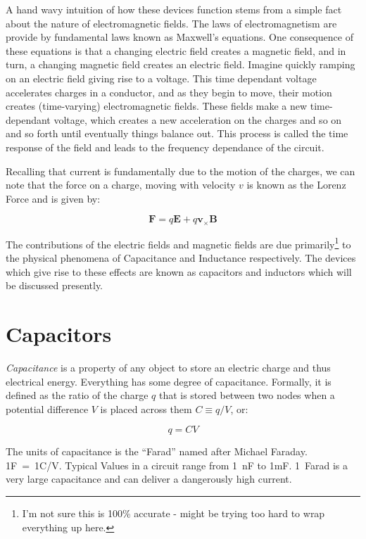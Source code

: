 \documentclass{tufte-book}
\begin{document}
A hand wavy intuition of how these devices function stems from a simple fact about the nature of electromagnetic fields. The laws of electromagnetism are provide by fundamental laws known as Maxwell's equations. One consequence of these equations is that a changing electric field creates a magnetic field, and in turn, a changing magnetic field creates an electric field. Imagine quickly ramping on an electric field giving rise to a voltage. This time dependant voltage accelerates charges in a conductor, and as they begin to move, their motion creates (time-varying) electromagnetic fields. These fields make a new time-dependant voltage, which creates a new acceleration on the charges and so on and so forth until eventually things balance out. This process is called the time response of the field and leads to the frequency dependance of the circuit.

Recalling that current is fundamentally due to the motion of the charges, we can note that the force on a charge, moving with velocity $v$ is known as the Lorenz Force and is given by:

\begin{equation}\label{eq:Lorenz}
\textbf{F} = q\textbf{E} + q\textbf{v}_\times\textbf{B}
\end{equation}

\noindent The contributions of the electric fields and magnetic fields are due primarily\footnote{I'm not sure this is 100\% accurate - might be trying too hard to wrap everything up here.} to the physical phenomena of Capacitance and Inductance respectively. The devices which give rise to these effects are known as capacitors and inductors which will be discussed presently.

\section{Capacitors}
\textit{Capacitance} is a property of any object to store an electric charge and thus electrical energy. Everything has some degree of capacitance. Formally, it is defined as the ratio of the charge $q$ that is stored between two nodes when a potential difference $V$ is placed across them $C\equiv q/V$, or:

\begin{equation}\label{def:capacitance}
q = CV
\end{equation}

\noindent The units of capacitance is the ``Farad'' named after Michael Faraday. 1F~=~1C/V. Typical Values in a circuit range from 1~nF to 1mF. 1~Farad is a very large capacitance and can deliver a dangerously high current.
\end{document}
